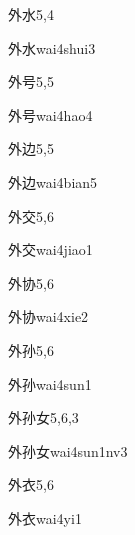 \begin{entry}{外水}{5,4}
  \begin{phonetics}{外水}{wai4shui3}
  \end{phonetics}
\end{entry}

\begin{entry}{外号}{5,5}
  \begin{phonetics}{外号}{wai4hao4}
  \end{phonetics}
\end{entry}

\begin{entry}{外边}{5,5}
  \begin{phonetics}{外边}{wai4bian5}
  \end{phonetics}
\end{entry}

\begin{entry}{外交}{5,6}
  \begin{phonetics}{外交}{wai4jiao1}
  \end{phonetics}
\end{entry}

\begin{entry}{外协}{5,6}
  \begin{phonetics}{外协}{wai4xie2}
  \end{phonetics}
\end{entry}

\begin{entry}{外孙}{5,6}
  \begin{phonetics}{外孙}{wai4sun1}
  \end{phonetics}
\end{entry}

\begin{entry}{外孙女}{5,6,3}
  \begin{phonetics}{外孙女}{wai4sun1nv3}
  \end{phonetics}
\end{entry}

\begin{entry}{外衣}{5,6}
  \begin{phonetics}{外衣}{wai4yi1}
  \end{phonetics}
\end{entry}

